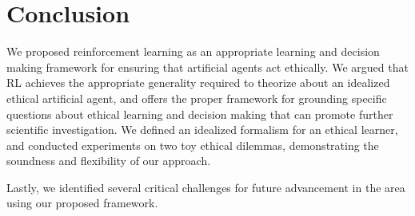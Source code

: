 \documentclass[11pt]{article}
\begin{document}
\section{Conclusion}

We proposed reinforcement learning as an appropriate learning and decision making framework for ensuring that artificial agents act ethically. We argued that RL achieves the appropriate generality required to theorize about an idealized ethical artificial agent, and offers the proper framework for grounding specific questions about ethical learning and decision making that can promote further scientific investigation. We defined an idealized formalism for an ethical learner, and conducted experiments on two toy ethical dilemmas, demonstrating the soundness and flexibility of our approach.

Lastly, we identified several critical challenges for future advancement in the area using our proposed framework.



\end{document}
